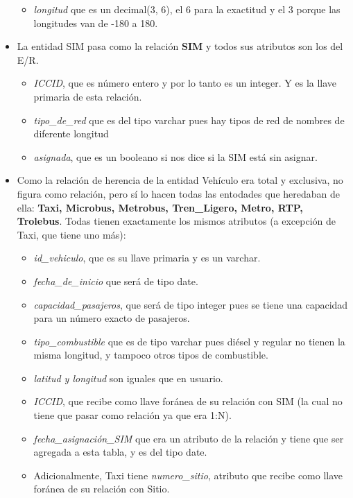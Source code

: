 \documentclass[11pt]{article}
\begin{document}
\begin{itemize}
\begin{itemize}
    \item \textit{longitud} que es un decimal(3, 6), el 6 para la exactitud y el 3 porque las longitudes van de -180 a 180.
    \end{itemize}   
\item La entidad SIM pasa como la relación \textbf{SIM} y todos sus atributos son los del E/R.
    \begin{itemize}
    \item \textit{ICCID}, que es número entero y por lo tanto es un integer. Y es la llave primaria de esta relación.
    \item \textit{tipo_de_red} que es del tipo varchar pues hay tipos de red de nombres de diferente longitud 
    \item \textit{asignada}, que es un booleano si nos dice si la SIM está sin asignar.
    \end{itemize}   
\item Como la relación de herencia de la entidad Vehículo era total y exclusiva, no figura como relación, pero sí lo hacen todas las entodades que heredaban de ella: \textbf{Taxi, Microbus, Metrobus, Tren\_Ligero, Metro, RTP, Trolebus}. Todas tienen exactamente los mismos atributos (a excepción de Taxi, que tiene uno más):
    \begin{itemize}
    \item \textit{id\_vehiculo}, que es su llave primaria y es un varchar.
    \item \textit{fecha\_de\_inicio} que será de tipo date.
    \item \textit{capacidad\_pasajeros}, que será de tipo integer pues se tiene una capacidad para un número exacto de pasajeros.
    \item \textit{tipo\_combustible} que es de tipo varchar pues diésel y regular no tienen la misma longitud, y tampoco otros tipos de combustible. 
    \item \textit{latitud y longitud} son iguales que en usuario.
    \item \textit{ICCID}, que recibe como llave foránea de su relación con SIM (la cual no tiene que pasar como relación ya que era 1:N).
    \item \textit{fecha\_asignación\_SIM} que era un atributo de la relación y tiene que ser agregada a esta tabla, y es del tipo date.
    \item Adicionalmente, Taxi tiene \textit{numero\_sitio}, atributo que recibe como llave foránea de su relación con Sitio. 
    \end{itemize}   

\end{itemize}
\end{document}
